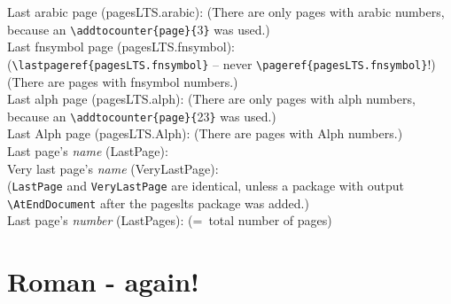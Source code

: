 \documentclass[british]{article}
\def\pagesLTSexampleArabic{3}
\def\pagesLTSexamplealph{23}
\begin{document}
\noindent Last arabic page (pagesLTS.arabic): 
(There are only  pages with arabic numbers,
because an \verb|\addtocounter{page}{|\pagesLTSexampleArabic\verb|}| was used.)\\

\noindent Last fnsymbol page (pagesLTS.fnsymbol):  \\
(\verb|\lastpageref{pagesLTS.fnsymbol}| -- never \verb|\pageref{pagesLTS.fnsymbol}|!)\\
(There are  pages with fnsymbol numbers.)\\

\noindent Last alph page (pagesLTS.alph): 
(There are only  pages with alph numbers,
because an \verb|\addtocounter{page}{|\pagesLTSexamplealph\verb|}| was used.)\\

\noindent Last Alph page (pagesLTS.Alph): 
(There are  pages with Alph numbers.)\\

\noindent Last page's \textit{name} (LastPage): \\

\noindent Very last page's \textit{name} (VeryLastPage): \\
(\texttt{LastPage} and \texttt{VeryLastPage} are identical, unless
a package with output \linebreak
\verb|\AtEndDocument| after the \textsf{pageslts} package was added.)\\

\noindent Last page's \textit{number} (LastPages): 
(=~total number of pages)\\

\lipsum[1-60]

\newpage


\section{Roman - again!\label{Roman2}}
\end{document}
